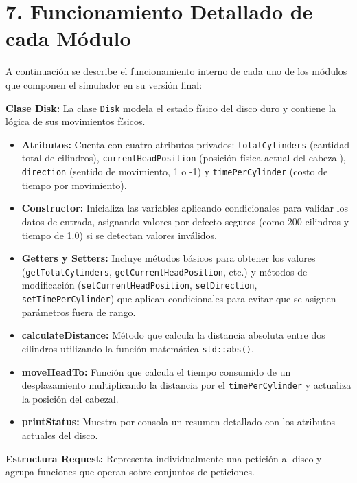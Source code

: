 \documentclass[14pt,letterpaper]{extarticle}
\begin{document}
\vfill

\section*{7. Funcionamiento Detallado de cada Módulo}

A continuación se describe el funcionamiento interno de cada uno de los módulos que componen el simulador en su versión final:

\textbf{Clase Disk:} La clase \texttt{Disk} modela el estado físico del disco duro y contiene la lógica de sus movimientos físicos.

\begin{itemize}
    \item \textbf{Atributos:} Cuenta con cuatro atributos privados: \texttt{totalCylinders} (cantidad total de cilindros), \texttt{currentHeadPosition} (posición física actual del cabezal), \texttt{direction} (sentido de movimiento, 1 o -1) y \texttt{timePerCylinder} (costo de tiempo por movimiento).
    \item \textbf{Constructor:} Inicializa las variables aplicando condicionales para validar los datos de entrada, asignando valores por defecto seguros (como 200 cilindros y tiempo de 1.0) si se detectan valores inválidos.
    \item \textbf{Getters y Setters:} Incluye métodos básicos para obtener los valores (\texttt{getTotalCylinders}, \texttt{getCurrentHeadPosition}, etc.) y métodos de modificación (\texttt{setCurrentHeadPosition}, \texttt{setDirection}, \texttt{setTimePerCylinder}) que aplican condicionales para evitar que se asignen parámetros fuera de rango.
    \item \textbf{calculateDistance:} Método que calcula la distancia absoluta entre dos cilindros utilizando la función matemática \texttt{std::abs()}.
    \item \textbf{moveHeadTo:} Función que calcula el tiempo consumido de un desplazamiento multiplicando la distancia por el \texttt{timePerCylinder} y actualiza la posición del cabezal.
    \item \textbf{printStatus:} Muestra por consola un resumen detallado con los atributos actuales del disco.
\end{itemize}

\textbf{Estructura Request:} Representa individualmente una petición al disco y agrupa funciones que operan sobre conjuntos de peticiones.
\end{document}

